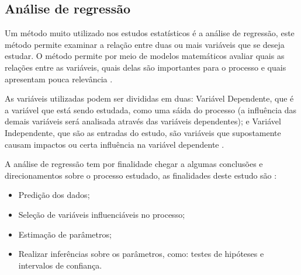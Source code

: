 \subsection{Análise de regressão}

Um método muito utilizado nos estudos estatísticos é a análise de regressão, este método permite examinar a relação entre duas ou mais variáveis que se deseja estudar. O método permite por meio de modelos matemáticos avaliar quais as relações entre as variáveis, quais delas são importantes para o processo e quais apresentam pouca relevância \cite{4}. 

As variáveis utilizadas podem ser divididas em duas: Variável Dependente, que é a variável que está sendo estudada, como uma sáida do processo (a influência das demais variáveis será analisada através das variáveis dependentes); e Variável Independente, que são as entradas do estudo, são variáveis que supostamente causam impactos ou certa influência na variável dependente \cite{4}.

A análise de regressão tem por finalidade chegar a algumas conclusões e direcionamentos sobre o processo estudado, as finalidades deste estudo são \cite{4}:

\begin{itemize}
    \item Predição dos dados;
    \item Seleção de variáveis influenciáveis no processo;
    \item Estimação de parâmetros;
    \item Realizar inferências sobre os parâmetros, como: testes de hipóteses e intervalos de confiança.
\end{itemize}

